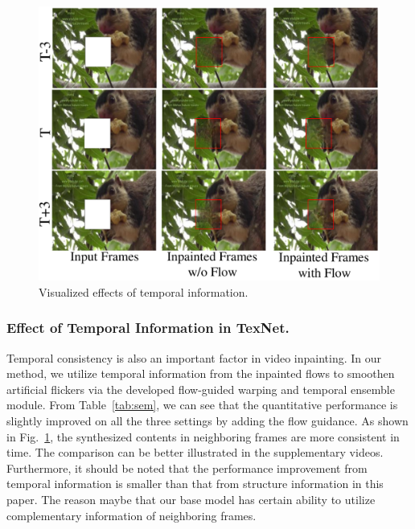 \begin{figure}[t]
	\centering
	\includegraphics[width=0.9\columnwidth]{flow_vis} %
	\caption{Visualized effects of temporal information.}
	\label{flow_vis}
\end{figure}

\subsubsection{Effect of Temporal Information in TexNet.}

Temporal consistency is also an important factor in video inpainting. 
In our method, we utilize temporal information from the inpainted flows to smoothen artificial flickers via the developed flow-guided warping and temporal ensemble module. 
From Table~\ref{tab:sem}, we can see that the quantitative performance is slightly improved on all the three settings by adding the flow guidance. 
As shown in Fig.~\ref{flow_vis}, the synthesized contents in neighboring frames are more consistent in time.
The comparison can be better illustrated in the supplementary videos.
Furthermore, it should be noted that the performance improvement from temporal information is smaller than that from structure information in this paper.
The reason maybe that our base model has certain ability to utilize complementary information of neighboring frames.


